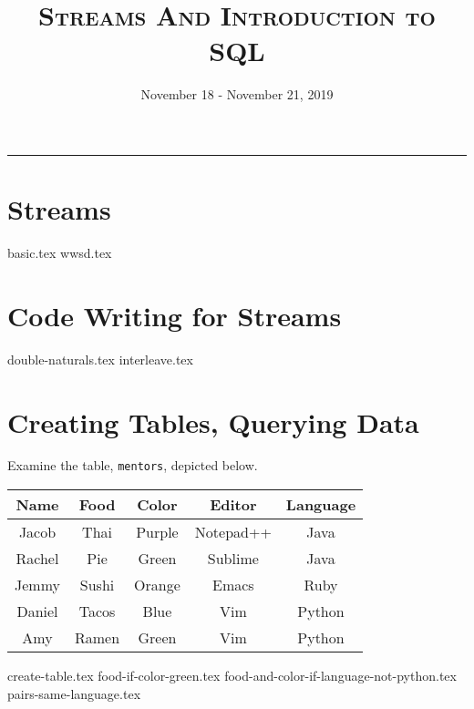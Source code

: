 \documentclass{exam}
\title{\textsc{Streams And Introduction to SQL}}
\date{November 18 - November 21, 2019}
\begin{document}
\maketitle\rule{\textwidth}{0.15em}
\fontsize{12}{15}\selectfont

\section{Streams}
\begin{questions}
{basic.tex}
\newpage
{wwsd.tex}
\end{questions}
\section{Code Writing for Streams}
\begin{questions}
{double-naturals.tex}
{interleave.tex}
\end{questions}

\section{Creating Tables, Querying Data}
Examine the table, \texttt{mentors}, depicted below.

\begin{center}
\begin{tabular}{|c|c|c|c|c|}
 \hline
 \textbf{Name} & \textbf{Food} & \textbf{Color} & \textbf{Editor} & \textbf{Language} \\
 \hline
 Jacob & Thai & Purple & Notepad++ & Java \\
 \hline
 Rachel & Pie & Green & Sublime & Java \\
 \hline
 Jemmy & Sushi & Orange & Emacs & Ruby \\
 \hline
 Daniel & Tacos & Blue & Vim & Python \\
 \hline
 Amy & Ramen & Green & Vim & Python \\
 \hline
\end{tabular}
\end{center}

\begin{questions}
{create-table.tex}
\newpage
{food-if-color-green.tex}
{food-and-color-if-language-not-python.tex}
{pairs-same-language.tex}
\end{questions}
\end{document}
